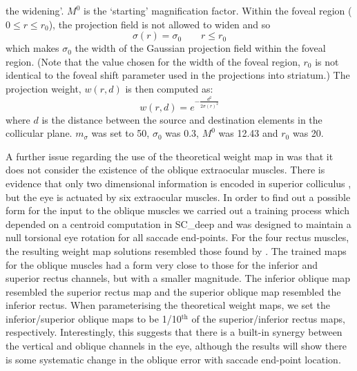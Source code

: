 \documentclass{frontiersSCNS}
\begin{document}
the widening'. $M^0$ is the `starting' magnification factor. Within
the foveal region ($0 \leq r \leq r_0$), the projection field is not
allowed to widen and so
\begin{equation} \label{eq:sigmar2}
\sigma(r) = \sigma_0 \qquad r \leq r_0
\end{equation}
which makes $\sigma_0$ the width of the Gaussian projection field
within the foveal region. (Note that the value chosen for the width of
the foveal region, $r_0$ is not identical to the foveal shift
parameter used in the  projections into striatum.)
The  projection weight, $w(r,d)$ is then computed
as:
\begin{equation} \label{eq:widening}
w(r,d) = e^{-\frac{d^2}{2\sigma\left(r\right)^2}}
\end{equation}
where $d$ is the distance between the source and destination elements
in the collicular plane.  $m_\sigma$ was set to 50, $\sigma_0$ was
0.3, $M^0$ was 12.43 and $r_0$ was 20.

A further issue regarding the use of the theoretical weight map
in \cite{tabareau_geometry_2007} was that it does not consider the
existence of the oblique extraocular muscles. There is evidence that
only two dimensional information is encoded in superior
colliculus
\citep{wurtz_activity_1972,hepp_monkey_1993,van_opstal_two-rather_1991},
but the eye is actuated by six extraocular muscles. In order to find
out a possible form for the input to the oblique muscles we carried
out a training process
which depended on a centroid computation in SC\_deep and was designed
to maintain a null torsional eye rotation for all saccade
end-points. For the four rectus muscles, the resulting weight map
solutions resembled those found by
\cite{arai_two-dimensional_1994}. The trained
maps for the oblique muscles had a form very close to those for the
inferior and superior rectus channels, but with a smaller magnitude.
The inferior oblique map resembled the superior rectus map and the
superior oblique map resembled the inferior rectus. When parameterising
the theoretical weight maps, we set the inferior/superior
oblique maps to be 1/10$^{\mathrm{th}}$ of the superior/inferior rectus
maps, respectively. Interestingly, this suggests that there is a built-in
synergy between the vertical and oblique channels in the eye, although
the results will show there is some systematic change in the oblique error
with saccade end-point location.
\end{document}
